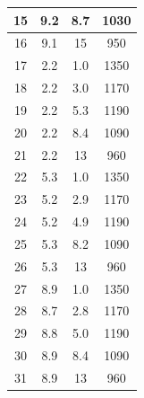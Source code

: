 \begin{table}[h]
\begin{center}
\begin{tabular}{|c|c|c|c|}
15        &  9.2              &  8.7                        &  1030                         \\ \hline
16        &  9.1              &  15                         &  950                          \\ \hline
17        &  2.2              &  1.0                        &  1350                         \\ \hline
18        &  2.2              &  3.0                        &  1170                         \\ \hline
19        &  2.2              &  5.3                        &  1190                         \\ \hline
20        &  2.2              &  8.4                        &  1090                         \\ \hline
21        &  2.2              &  13                         &  960                          \\ \hline
22        &  5.3              &  1.0                        &  1350                         \\ \hline
23        &  5.2              &  2.9                        &  1170                         \\ \hline
24        &  5.2              &  4.9                        &  1190                         \\ \hline
25        &  5.3              &  8.2                        &  1090                         \\ \hline
26        &  5.3              &  13                         &  960                          \\ \hline
27        &  8.9              &  1.0                        &  1350                         \\ \hline
28        &  8.7              &  2.8                        &  1170                         \\ \hline
29        &  8.8              &  5.0                        &  1190                         \\ \hline
30        &  8.9              &  8.4                        &  1090                         \\ \hline
31        &  8.9              &  13                         &  960                          \\ \hline
\end{tabular}
\end{center}
\label{Sippola_Aerosol_Deposition_Summary}
\end{table}


